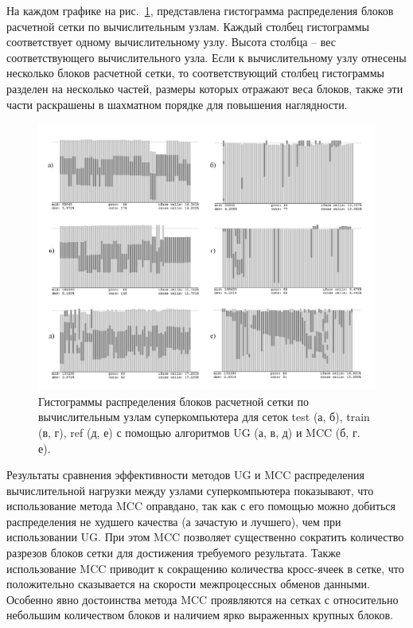 На каждом графике на рис.~\ref{fig:text_2_withcut_2_merged_pic}, представлена гистограмма распределения блоков расчетной сетки по вычислительным узлам.
Каждый столбец гистограммы соответствует одному вычислительному узлу.
Высота столбца – вес соответствующего вычислительного узла.
Если к вычислительному узлу отнесены несколько блоков расчетной сетки, то соответствующий столбец гистограммы разделен на несколько частей, размеры которых отражают веса блоков, также эти части раскрашены в шахматном порядке для повышения наглядности.

\begin{figure}[ht]
	\centering
	\includegraphics[width=1.0\textwidth]{./pics/text_2_withcut/2-merged-pic.pdf}
	\caption{Гистограммы распределения блоков расчетной сетки по вычислительным узлам суперкомпьютера для сеток            test (а, б), train (в, г), ref (д, е) с помощью алгоритмов UG (а, в, д) и MCC (б, г. е).}
	\label{fig:text_2_withcut_2_merged_pic}
\end{figure}

Результаты сравнения эффективности методов UG и MCC распределения вычислительной нагрузки между узлами суперкомпьютера показывают, что использование метода MCC оправдано, так как с его помощью можно добиться распределения не худшего качества (а зачастую и лучшего), чем при использовании UG.
При этом MCC позволяет существенно сократить количество разрезов блоков сетки для достижения требуемого результата.
Также использование MCC приводит к сокращению количества кросс-ячеек в сетке, что положительно сказывается на скорости межпроцессных обменов данными.
Особенно явно достоинства метода MCC проявляются на сетках с относительно небольшим количеством блоков и наличием ярко выраженных крупных блоков.

